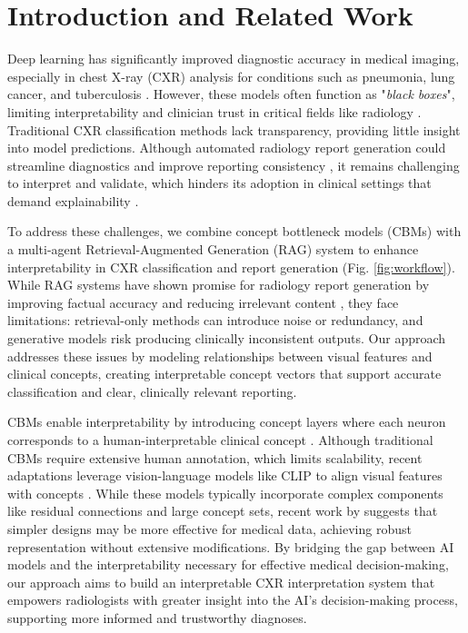 \documentclass[runningheads]{llncs}
\begin{document}
\section{Introduction and Related Work}

Deep learning has significantly improved diagnostic accuracy in medical imaging, especially in chest X-ray (CXR) analysis for conditions such as pneumonia, lung cancer, and tuberculosis \cite{srivastav2021improved,hwang2019development}. However, these models often function as "\textit{black boxes}", limiting interpretability and clinician trust in critical fields like radiology \cite{de2023classification}. Traditional CXR classification methods lack transparency, providing little insight into model predictions. Although automated radiology report generation could streamline diagnostics and improve reporting consistency \cite{jing2017automatic}, it remains challenging to interpret and validate, which hinders its adoption in clinical settings that demand explainability \cite{holzinger2019causability}.

To address these challenges, we combine concept bottleneck models (CBMs) \cite{koh2020concept} with a multi-agent Retrieval-Augmented Generation (RAG) \cite{lewis2020retrieval,li2024more} system to enhance interpretability in CXR classification and report generation (Fig. \ref{fig:workflow}). While RAG systems have shown promise for radiology report generation by improving factual accuracy and reducing irrelevant content \cite{ranjit2023retrieval,bernardi2024report,sun2024fact,xia2024mmed,liang2024optimizing}, they face limitations: retrieval-only methods can introduce noise or redundancy, and generative models risk producing clinically inconsistent outputs. Our approach addresses these issues by modeling relationships between visual features and clinical concepts, creating interpretable concept vectors that support accurate classification and clear, clinically relevant reporting. 

CBMs enable interpretability by introducing concept layers where each neuron corresponds to a human-interpretable clinical concept \cite{koh2020concept,chauhan2023interactive}. Although traditional CBMs require extensive human annotation, which limits scalability, recent adaptations leverage vision-language models like CLIP \cite{radford2021learning} to align visual features with concepts \cite{oikarinen2023label,yuksekgonul2022post}. While these models typically incorporate complex components like residual connections and large concept sets, recent work by \cite{yan2023robust} suggests that simpler designs may be more effective for medical data, achieving robust representation without extensive modifications.
By bridging the gap between AI models and the interpretability necessary for effective medical decision-making, our approach aims to build an interpretable CXR interpretation system that empowers radiologists with greater insight into the AI’s decision-making process, supporting more informed and trustworthy diagnoses.
\end{document}
